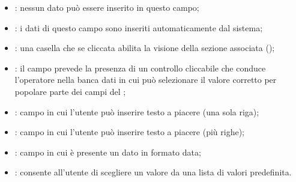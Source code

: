 \begin{itemize}
\item{: nessun dato può essere inserito in questo campo;}
\item{: i dati di questo campo sono inseriti automaticamente dal sistema;}
\item{: una casella che se cliccata abilita la visione della sezione associata ();}
\item{: il campo prevede la presenza di un controllo cliccabile che conduce l'operatore nella banca dati in cui può selezionare il valore corretto per popolare parte dei campi del ;}
\item{: campo in cui l'utente può inserire testo a piacere (una sola riga);}
\item{: campo in cui l'utente può inserire testo a piacere (più righe);}
\item{: campo in cui è presente un dato in formato data;}
\item{: consente all'utente di scegliere un valore da una lista di valori predefinita.}
\end{itemize}

\clearpage{}

